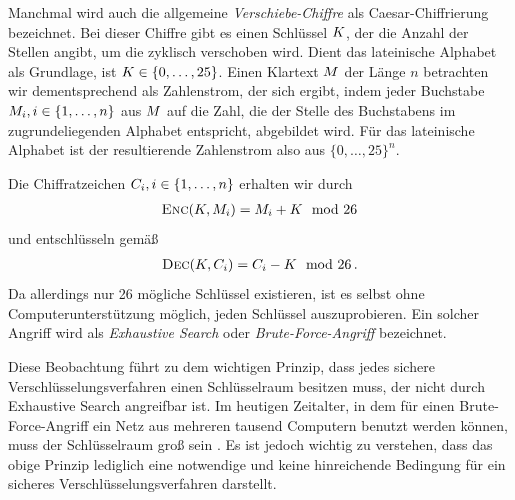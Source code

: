 Manchmal wird auch die allgemeine \emph{Verschiebe-Chiffre} als Caesar-Chiffrierung bezeichnet. Bei dieser Chiffre gibt es einen Schlüssel $K$, der die Anzahl der Stellen angibt, um die zyklisch verschoben wird. Dient das lateinische Alphabet als Grundlage, ist $K \in \{0,\dots,25\}$. Einen Klartext $M$ der Länge $n$ betrachten wir dementsprechend als Zahlenstrom, der sich ergibt, indem jeder Buchstabe $M_{i}, i \in \{1,\dots,n\}$ aus $M$ auf die Zahl, die der Stelle des Buchstabens im zugrundeliegenden Alphabet entspricht, abgebildet wird. Für das lateinische Alphabet ist der resultierende Zahlenstrom also aus $\{0,\dots,25\}^{n}$. 

Die Chiffratzeichen $C_{i}, i \in \{1,\dots,n\}$ erhalten wir durch 
\begin{align*}
	\textsc{Enc}(K, M_i) = M_i + K \mod 26
\end{align*}
und entschlüsseln gemäß
\begin{align*}
	\textsc{Dec}(K, C_i) = C_i - K \mod 26\, .
\end{align*}
Da allerdings nur 26 mögliche Schlüssel existieren, ist es selbst ohne Computerunterstützung möglich, jeden Schlüssel auszuprobieren. Ein solcher Angriff wird als \emph{Exhaustive Search} oder \emph{Brute-Force-Angriff} bezeichnet.


Diese Beobachtung führt zu dem wichtigen Prinzip, dass jedes sichere Verschlüsselungsverfahren einen Schlüsselraum besitzen muss, der nicht durch Exhaustive Search angreifbar ist. Im heutigen Zeitalter, in dem für einen Brute-Force-Angriff ein Netz aus mehreren tausend Computern benutzt werden können, muss der Schlüsselraum groß sein \cite{NIST_800_57, Blaze1996}. Es ist jedoch wichtig zu verstehen, dass das obige Prinzip lediglich eine notwendige und keine hinreichende Bedingung für ein sicheres Verschlüsselungsverfahren darstellt.

